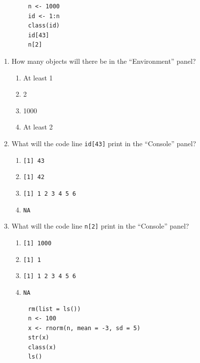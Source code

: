 \documentclass{article}
\begin{document}
\begin{lstlisting}
        n <- 1000 
        id <- 1:n 
        class(id)
        id[43]
        n[2]
\end{lstlisting}

\begin{enumerate}
  \item How many objects will there be in the ``Environment'' panel?
  \begin{enumerate}[label=\Alph*)]
    \item At least 1
    \item 2
    \item 1000
    \item At least 2
  \end{enumerate}
  \item What will the code line \texttt{id[43]} print in the ``Console'' panel?
  \begin{enumerate}[label=\Alph*)]
    \item \texttt{[1] 43}
    \item \texttt{[1] 42}
    \item \texttt{[1] 1 2 3 4 5 6}
    \item \texttt{NA}
  \end{enumerate}
  \item What will the code line \texttt{n[2]} print in the ``Console'' panel?
  \begin{enumerate}[label=\Alph*)]
    \item \texttt{[1] 1000}
    \item \texttt{[1] 1}
    \item \texttt{[1] 1 2 3 4 5 6}
    \item \texttt{NA}
  \end{enumerate}
\end{enumerate}

\newpage

\begin{lstlisting}
        rm(list = ls())
        n <- 100
        x <- rnorm(n, mean = -3, sd = 5)
        str(x)
        class(x)
        ls()
\end{lstlisting}
\end{document}
